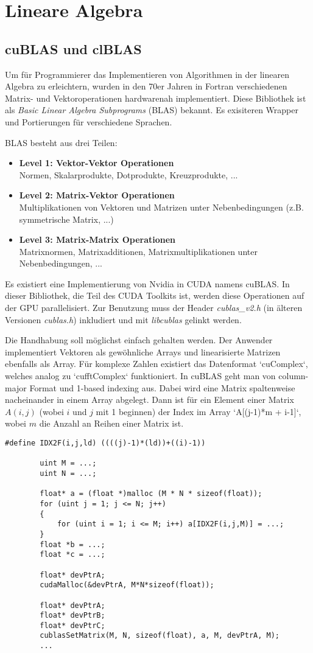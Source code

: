 	\section{Lineare Algebra}
		\subsection{cuBLAS und clBLAS}
		Um für Programmierer das Implementieren von Algorithmen in der linearen Algebra zu erleichtern, wurden in den 70er Jahren in Fortran verschiedenen Matrix- und Vektoroperationen hardwarenah implementiert. Diese Bibliothek ist als \textit{Basic Linear Algebra Subprograms} (BLAS) bekannt. Es exisiteren Wrapper und Portierungen für verschiedene Sprachen.
	
		BLAS besteht aus drei Teilen:
		\begin{itemize}
			\item \textbf{Level 1: Vektor-Vektor Operationen}\\
			Normen, Skalarprodukte, Dotprodukte, Kreuzprodukte, ...
			\item \textbf{Level 2: Matrix-Vektor Operationen}\\ Multiplikationen von Vektoren und Matrizen unter Nebenbedingungen (z.B. symmetrische Matrix, ...)
			\item \textbf{Level 3: Matrix-Matrix Operationen}\\Matrixnormen, Matrixadditionen, Matrixmultiplikationen unter Nebenbedingungen, ...
		\end{itemize}
		
		Es existiert eine Implementierung von Nvidia in CUDA namens cuBLAS. In dieser Bibliothek, die Teil des CUDA Toolkits ist, werden diese Operationen auf der GPU parallelisiert. Zur Benutzung muss der Header \textit{cublas{\_}v2.h} (in älteren Versionen \textit{cublas.h}) inkludiert und mit \textit{libcublas} gelinkt werden.
		
		Die Handhabung soll möglichst einfach gehalten werden. Der Anwender implementiert Vektoren als gewöhnliche Arrays und linearisierte Matrizen ebenfalls als Array. Für komplexe Zahlen existiert das Datenformat \li`cuComplex`, welches analog zu \li`cufftComplex` funktioniert. In cuBLAS geht man von column-major Format und 1-based indexing aus. Dabei wird eine Matrix spaltenweise nacheinander in einem Array abgelegt. Dann ist für ein Element einer Matrix $A(i,j)$ (wobei $i$ und $j$ mit 1 beginnen) der Index im Array \li`A[(j-1)*m + i-1]`, wobei $m$ die Anzahl an Reihen einer Matrix ist. 
		\begin{lstlisting}[caption=cuBLAS: Matrix setzen]
		#define IDX2F(i,j,ld) ((((j)-1)*(ld))+((i)-1))
		
		uint M = ...;
		uint N = ...;	

		float* a = (float *)malloc (M * N * sizeof(float));
		for (uint j = 1; j <= N; j++) 
		{
			for (uint i = 1; i <= M; i++) a[IDX2F(i,j,M)] = ...;
		}
		float *b = ...;
		float *c = ...;

		float* devPtrA;
		cudaMalloc(&devPtrA, M*N*sizeof(float));

		float* devPtrA;
		float* devPtrB;
		float* devPtrC;
		cublasSetMatrix(M, N, sizeof(float), a, M, devPtrA, M);
		...
		\end{lstlisting}
		
